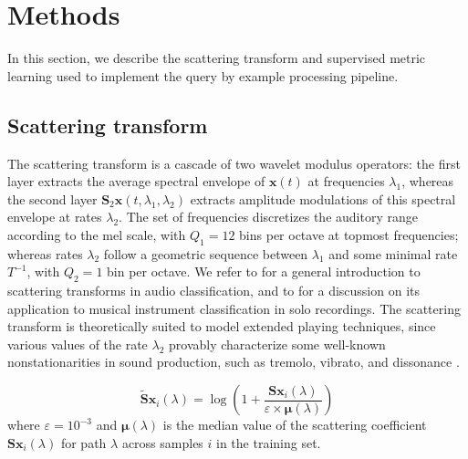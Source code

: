 \documentclass{article}
\begin{document}



\section{Methods}

In this section, we describe the scattering transform and supervised metric learning used to implement the query by example processing pipeline.

\subsection{Scattering transform} %
The scattering transform is a cascade of two wavelet modulus operators:
the first layer extracts the average spectral envelope of $\boldsymbol{x}(t)$ at frequencies $\lambda_1$, whereas the second layer $\mathbf{S}_2 \boldsymbol{x} (t, \lambda_1, \lambda_2)$ extracts amplitude modulations of this spectral envelope at rates $\lambda_2$.
The set of frequencies discretizes the auditory range according to the mel scale, with $Q_1 = 12$ bins per octave at topmost frequencies; whereas rates $\lambda_2$ follow a geometric sequence between $\lambda_1$ and some minimal rate $T^{-1}$, with $Q_2 = 1$ bin per octave.
We refer to \cite{anden2014taslp} for a general introduction to scattering transforms in audio classification, and to \cite{lostanlen2017phd} for a discussion on its application to musical instrument classification in solo recordings. The scattering transform is theoretically suited to model extended playing techniques, since various values of the rate $\lambda_2$ provably characterize some well-known nonstationarities in sound production, such as tremolo, vibrato, and dissonance \cite{anden2012dafx}.

\begin{equation}
\widetilde{\mathbf{S}} \boldsymbol{x}_i(\lambda) =
\log \left(
1 + \dfrac{\mathbf{S}\boldsymbol{x}_i(\lambda)}{\varepsilon \times \boldsymbol{\mu}(\lambda)}
\right)
\end{equation}
where $\varepsilon = 10^{-3}$ and $\boldsymbol{\mu}(\lambda)$ is the median value of the scattering coefficient $\mathbf{S}\boldsymbol{x}_i (\lambda)$ for path $\lambda$ across samples $i$ in the training set.
\end{document}

